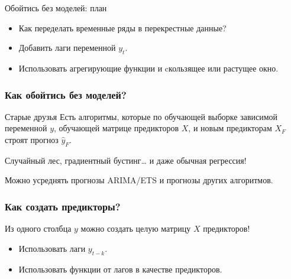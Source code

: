
\begin{frame} %


\end{frame}



\begin{frame}{Обойтись без моделей: план}
  \begin{itemize}[<+->]
    \item Как переделать временные ряды в перекрестные данные? 
    \item Добавить \alert{лаги} переменной $y_t$.
    \item Использовать \alert{агрегирующие функции} и \alert{cкользящее} или \alert{растущее} окно. 
  \end{itemize}

\end{frame}


\begin{frame}
  \frametitle{Как обойтись без моделей?}

  \begin{block}{Старые друзья}
    Есть алгоритмы, которые по обучающей выборке зависимой переменной $y$, 
    обучающей матрице предикторов $X$, и новым предикторам $X_F$ строят прогноз $\hat y_F$.      
  \end{block}

  \pause

  \alert{Случайный лес}, \alert{градиентный бустинг}\ldots{ }\pause и даже \alert{обычная регрессия}!

  \pause 

  Можно \alert{усреднять} прогнозы ARIMA/ETS и прогнозы других алгоритмов.

\end{frame}


\begin{frame}
  \frametitle{Как создать предикторы?}

  Из одного столбца $y$ можно создать целую матрицу $X$ предикторов!

  \begin{itemize}[<+->]
    \item Использовать \alert{лаги} $y_{t-k}$. 
    \item Использовать \alert{функции от лагов} в качестве предикторов. 
  \end{itemize}


\end{frame}

